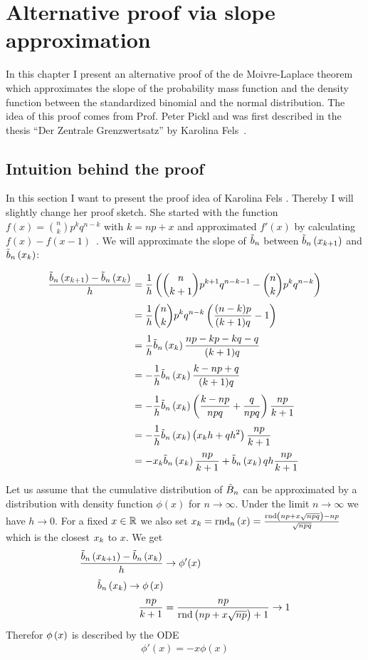 \chapter{Alternative proof via slope approximation}

In this chapter I present an alternative proof of the de Moivre-Laplace theorem which approximates the slope of the probability mass function and the density function between the standardized binomial and the normal distribution. The idea of this proof comes from Prof. Peter Pickl and was first described in the thesis ``Der Zentrale Grenzwertsatz'' by Karolina Fels~\cite{fels}.

\section{Intuition behind the proof}

In this section I want to present the proof idea of Karolina Fels \cite[pp. 16-19]{fels}. Thereby I will slightly change her proof sketch. She started with the function $f(x) = \binom nk p^kq^{n-k}$ with $k=np+x$ and approximated $f'(x)$ by calculating $f(x)-f(x-1)$~\cite[p. 16]{fels}. We will approximate the slope of $\bbs$ between $\bb{\x[k+1]}$ and $\bb{\x[k]}$:

\begin{align}
  \frac{\bb{\x[k+1]}-\bb{\x[k]}}h &= \frac 1h \br{\binom n{k+1}p^{k+1}q^{n-k-1} - \binom nk p^k q^{n-k}} \nl
  &= \frac 1h \binom nk p^k q^{n-k} \br{\frac{(n-k)p}{(k+1)q}-1} \nl
  &= \frac 1h \bb{\x[k]} \frac{np-kp-kq-q}{(k+1)q} \nl
  &= - \frac 1h \bb{\x[k]} \frac{k-np+q}{(k+1)q} \nl
  &= - \frac 1h \bb{\x[k]} \br{\frac{k-np}{npq} + \frac{q}{npq}} \frac{np}{k+1} \nl
  &= - \frac 1h \bb{\x[k]} \br{\x[k]h + q h^2} \frac{np}{k+1} \nl
  &= -\x[k] \bb{\x[k]} \frac{np}{k+1} + \bb{\x[k]} q h \frac{np}{k+1}
\end{align}

Let us assume that the cumulative distribution of $\BBs$ can be approximated by a distribution with density function $\phi(x)$ for $n\to\infty$. Under the limit $n\to\infty$ we have $h\to 0$. For a fixed $x\in\R$ we also set $\x = \xrnd{x} = \frac{\rnd{np+ x \sqrt{npq}}-np}{\sqrt{npq}}$ which is the closest $\x$ to $x$. We get
\begin{align}
  \frac{\bb{\x[k+1]}-\bb{\x[k]}}h & \to \phi'(x) \nl
  \bb{\x[k]} \to \fphi{x} \nl
  \frac{np}{k+1} &= \frac{np}{\rnd{np+x\sqrt{np}}+1} \to 1
\end{align}
Therefor $\fphi{x}$ is described by the ODE
\begin{align}
  \phi'(x) = -x\phi(x)
\end{align}

